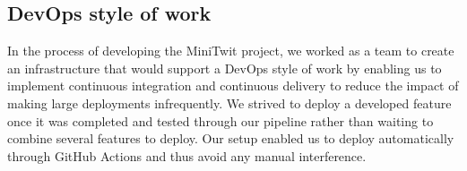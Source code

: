 \subsection{DevOps style of work}
In the process of developing the MiniTwit project, we worked as a team to create an infrastructure that would support a DevOps style of work by enabling us 
to implement continuous integration and continuous delivery to reduce the impact of making large deployments infrequently. We strived to deploy a developed 
feature once it was completed and tested through our pipeline rather than waiting to combine several features to deploy. Our setup enabled us to deploy automatically
through GitHub Actions and thus avoid any manual interference.